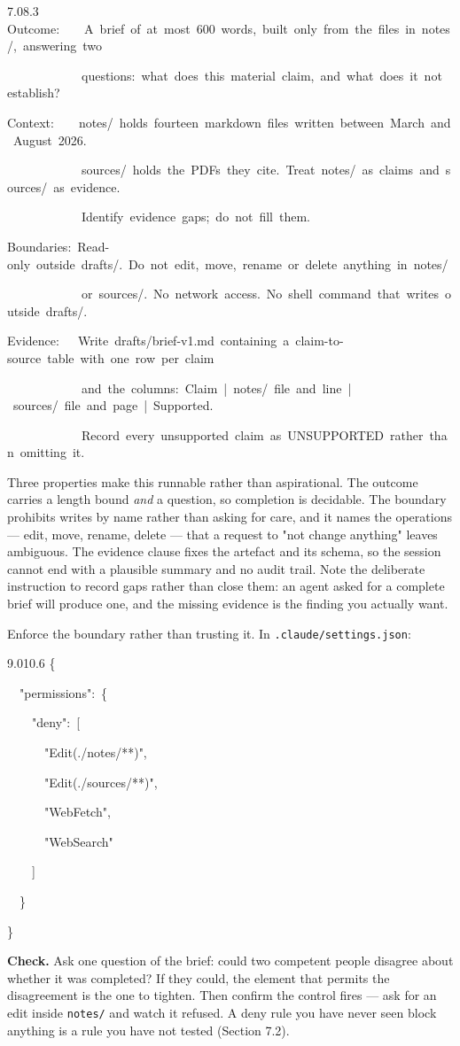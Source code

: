 \documentclass[11pt,a4paper,twoside,openany]{book}
\newcommand{\cl}[1]{\noindent\mbox{#1}\par}
\begin{document}
\begin{codeblock}{7.0}{8.3}
\cl{Outcome:~~~~A~brief~of~at~most~600~words,~built~only~from~the~files~in~notes/,~answering~two}
\cl{~~~~~~~~~~~~questions:~what~does~this~material~claim,~and~what~does~it~not~establish?}
\cl{Context:~~~~notes/~holds~fourteen~markdown~files~written~between~March~and~August~2026.}
\cl{~~~~~~~~~~~~sources/~holds~the~PDFs~they~cite.~Treat~notes/~as~claims~and~sources/~as~evidence.}
\cl{~~~~~~~~~~~~Identify~evidence~gaps;~do~not~fill~them.}
\cl{Boundaries:~Read-only~outside~drafts/.~Do~not~edit,~move,~rename~or~delete~anything~in~notes/}
\cl{~~~~~~~~~~~~or~sources/.~No~network~access.~No~shell~command~that~writes~outside~drafts/.}
\cl{Evidence:~~~Write~drafts/brief-v1.md~containing~a~claim-to-source~table~with~one~row~per~claim}
\cl{~~~~~~~~~~~~and~the~columns:~Claim~|~notes/~file~and~line~|~sources/~file~and~page~|~Supported.}
\cl{~~~~~~~~~~~~Record~every~unsupported~claim~as~UNSUPPORTED~rather~than~omitting~it.}
\end{codeblock}

Three properties make this runnable rather than aspirational. The outcome carries a length bound \emph{and} a question, so completion is decidable. The boundary prohibits writes by name rather than asking for care, and it names the operations — edit, move, rename, delete — that a request to "not change anything" leaves ambiguous. The evidence clause fixes the artefact and its schema, so the session cannot end with a plausible summary and no audit trail. Note the deliberate instruction to record gaps rather than close them: an agent asked for a complete brief will produce one, and the missing evidence is the finding you actually want.


Enforce the boundary rather than trusting it. In \texttt{.\allowbreak{}claude/\allowbreak{}settings.\allowbreak{}json}:


\begin{codeblock}{9.0}{10.6}
\cl{\{}
\cl{~~"permissions":~\{}
\cl{~~~~"deny":~[}
\cl{~~~~~~"Edit(./notes/**)",}
\cl{~~~~~~"Edit(./sources/**)",}
\cl{~~~~~~"WebFetch",}
\cl{~~~~~~"WebSearch"}
\cl{~~~~]}
\cl{~~\}}
\cl{\}}
\end{codeblock}

\textbf{Check.} Ask one question of the brief: could two competent people disagree about whether it was completed? If they could, the element that permits the disagreement is the one to tighten. Then confirm the control fires — ask for an edit inside \texttt{notes/\allowbreak{}} and watch it refused. A deny rule you have never seen block anything is a rule you have not tested (Section 7.2).
\end{document}
